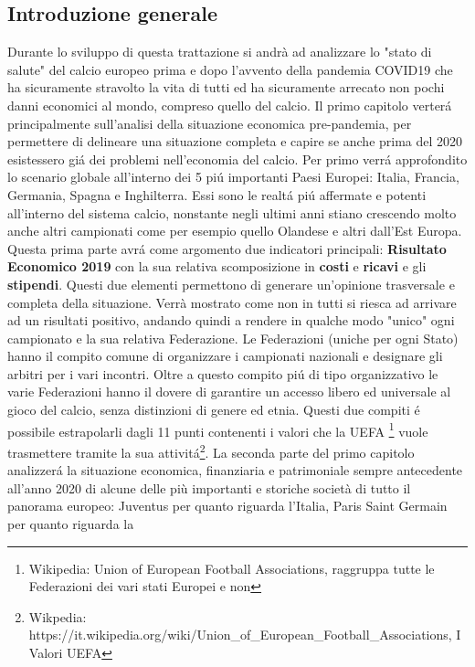 \documentclass[
    corpo=12pt,
    oneside,
    evenboxes,
    tipotesi=triennale,
    stile=classica,
    oldstyle,
    autoretitolo,
    greek,
]{toptesi}
\begin{document}
\begin{interlinea}{1.5}
\chapter{Introduzione generale}
Durante lo sviluppo di questa trattazione si andrà ad analizzare lo "stato di salute" del calcio europeo prima e dopo 
l'avvento della pandemia COVID19 che ha sicuramente stravolto la vita di tutti ed ha sicuramente arrecato non pochi danni 
economici al mondo, compreso quello del calcio.\newline
Il primo capitolo verter\'a principalmente sull'analisi della situazione economica pre-pandemia, per permettere di delineare una situazione
completa e capire se anche prima del 2020 esistessero gi\'a dei problemi nell'economia del calcio. Per primo verr\'a approfondito lo scenario
globale all'interno dei 5 pi\'u importanti Paesi Europei: Italia, Francia, Germania, Spagna e Inghilterra. Essi sono le realt\'a pi\'u 
affermate e potenti all'interno del sistema calcio, nonstante negli ultimi anni stiano crescendo molto anche altri campionati come per esempio
quello Olandese e altri dall'Est Europa. Questa prima parte avr\'a come argomento due indicatori principali: \textbf{Risultato Economico 2019} 
con la sua relativa scomposizione in \textbf{costi} e \textbf{ricavi} e gli \textbf{stipendi}. Questi due elementi
permettono di generare un'opinione trasversale e completa della situazione. Verrà mostrato come non in tutti 
si riesca ad arrivare ad un risultati positivo, andando quindi a rendere in qualche modo 
"unico" ogni campionato e la sua relativa Federazione. Le Federazioni (uniche per ogni Stato) hanno il compito
comune di organizzare i campionati nazionali e designare gli arbitri per i vari incontri. Oltre a questo compito pi\'u di tipo
organizzativo le varie Federazioni hanno il dovere di garantire un accesso libero ed universale al gioco del calcio, senza distinzioni
di genere ed etnia. Questi due compiti \'e possibile estrapolarli dagli 11 punti contenenti i valori che la UEFA
\footnote{Wikipedia: Union of European Football Associations, raggruppa tutte le Federazioni dei vari stati Europei e non} vuole
trasmettere tramite la sua attivit\'a\footnote{Wikpedia: https://it.wikipedia.org/wiki/Union\_of\_European\_Football\_Associations, I Valori UEFA}.\newline
La seconda parte del primo capitolo analizzer\'a la situazione economica, finanziaria e patrimoniale sempre antecedente all'anno 2020 di alcune delle più 
importanti e storiche societ\`a di tutto il panorama europeo: Juventus per quanto riguarda l'Italia, Paris Saint Germain per quanto riguarda la 

\end{interlinea}
\end{document}

